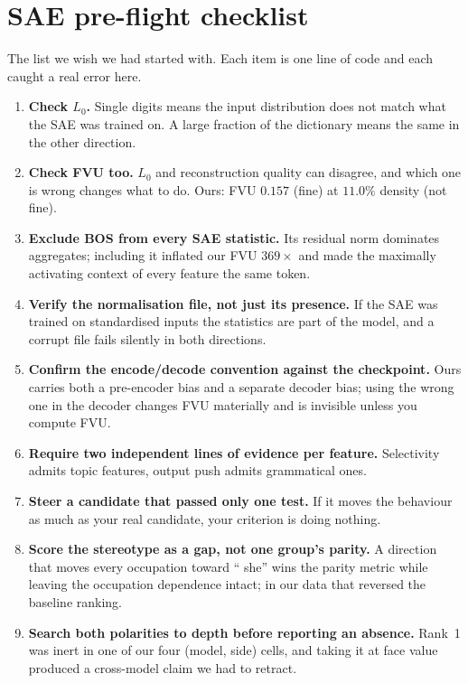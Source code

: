\documentclass{article}
\begin{document}
\section{SAE pre-flight checklist}\label{app:checklist}

The list we wish we had started with. Each item is one line of code and each caught a real
error here.

\begin{enumerate}\itemsep1pt
\item \textbf{Check $L_0$.} Single digits means the input distribution does not match what
the SAE was trained on. A large fraction of the dictionary means the same in the other
direction.
\item \textbf{Check FVU too.} $L_0$ and reconstruction quality can disagree, and which one
is wrong changes what to do. Ours: FVU $0.157$ (fine) at $11.0\%$ density (not fine).
\item \textbf{Exclude BOS from every SAE statistic.} Its residual norm dominates
aggregates; including it inflated our FVU $369\times$ and made the maximally activating
context of every feature the same token.
\item \textbf{Verify the normalisation file, not just its presence.} If the SAE was trained
on standardised inputs the statistics are part of the model, and a corrupt file fails
silently in both directions.
\item \textbf{Confirm the encode/decode convention against the checkpoint.} Ours carries
both a pre-encoder bias and a separate decoder bias; using the wrong one in the decoder
changes FVU materially and is invisible unless you compute FVU.
\item \textbf{Require two independent lines of evidence per feature.} Selectivity admits
topic features, output push admits grammatical ones.
\item \textbf{Steer a candidate that passed only one test.} If it moves the behaviour as
much as your real candidate, your criterion is doing nothing.
\item \textbf{Score the stereotype as a gap, not one group's parity.} A direction that
moves every occupation toward `` she'' wins the parity metric while leaving the occupation
dependence intact; in our data that reversed the baseline ranking.
\item \textbf{Search both polarities to depth before reporting an absence.} Rank~1 was
inert in one of our four (model, side) cells, and taking it at face value produced a
cross-model claim we had to retract.
\end{enumerate}
\end{document}
